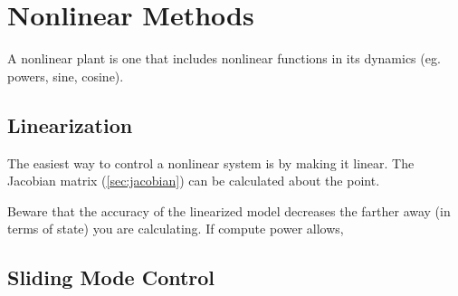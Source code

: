 \documentclass[../notes.tex]{subfiles}
\begin{document}
\section{Nonlinear Methods}
A nonlinear plant is one that includes nonlinear functions in its dynamics (eg. powers, sine, cosine).
\subsection{Linearization}
The easiest way to control a nonlinear system is by making it linear. The Jacobian matrix (\underline{\ref{sec:jacobian}}) can be calculated about the point.
\begin{emphasis}
    Beware that the accuracy of the linearized model decreases the farther away (in terms of state) you are calculating. If compute power allows, 
\end{emphasis}
\subsection{Sliding Mode Control}
\end{document}
